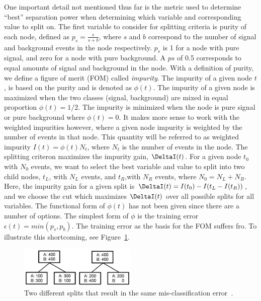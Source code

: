One important detail not mentioned thus far is the metric used to determine ``best'' separation power when determining which variable and corresponding value to split on.
The first variable to consider for splitting criteria is purity of each node, defined as $p_{s}=\frac{s}{s+b}$, where $s$ and $b$ correspond to the number of signal and background
events in the node respectively. $p_{s}$ is 1 for a node with pure signal, and zero for a node with pure background. A $p{s}$ of 0.5 corresponds to equal amounts of signal and background
in the node. With a definition of purity, we define a figure of merit (FOM) called \textit{impurity}. The impurity of a given node $t$, is based on the purity and is denoted as
$\phi(t)$.
The impurity of a given node is maximized when the two classes (signal, background) are mixed in equal proportion $\phi(t) = 1/2$. The impurity is minimized when the node is pure
signal or pure background where $\phi(t) = 0$.
It makes more sense to work with the weighted impurities however, where a given node impurity is weighted by the number of events in that node. This quantity
will be referred to as weighted impurity $I(t) = \phi(t)N_{t}$, where $N_{t}$ is the number of events in the node. 
The splitting criteron maximizes the impurity gain, $\DeltaI(t)$. For a given node $t_{0}$ with $N_{0}$ events, we want to
select the best variable and value to split into two child nodes, $t_{L}$, with $N_{L}$ events, and $t_{R}$,with $N_{R}$ events, where $N_{0} = N_{L} + N_{R}$. Here, the
impurity gain for a given split is $\DeltaI(t) = I(t_{0}) - I(t_{L} - I(t_{R}))$, and we choose the cut which maximizes $\DeltaI(t)$ over all possible splits for all variables.
The functional form of $\phi(t)$ has not been given since there are a number of options. The simplest form of $\phi$ is the training error $\epsilon(t) = min(p_{s},p_{b})$.
The training error as the basis for the FOM suffers fro. To illustrate this shortcoming, see Figure~\ref{fig:tree_split}.

\begin{figure}[hbtp]
 \begin{center}
   \includegraphics[width=0.5\textwidth]{ap2_figs/tree_split.pdf}
   \caption[Two splits with the same error rate.]{Two different splits that result in the same mis-classification error~\cite{illya}.}
   \label{fig:tree_split}
 \end{center}
\end{figure}

